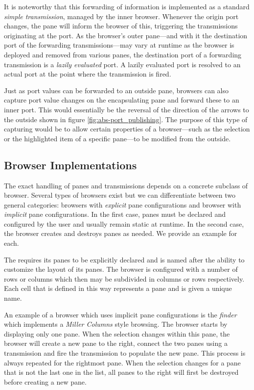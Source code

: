 \documentclass[a4paper,10pt,twoside]{book}
\begin{document}
It is noteworthy that this forwarding of information is implemented as a standard \emph{simple transmission}, managed by the inner browser. Whenever the origin port changes, the pane will inform the browser of this, triggering the transmissions originating at the port. As the browser's outer pane---and with it the destination port of the forwarding transmissions---may vary at runtime as the browser is deployed and removed from various panes, the destination port of a forwarding transmission is a \emph{lazily evaluated} port. A lazily evaluated port is resolved to an actual port at the point where the transmission is fired.

Just as port values can be forwarded to an outside pane, browsers can also capture port value changes on the encapsulating pane and forward these to an inner port. This would essentially be the reversal of the direction of the arrows to the outside shown in figure \ref{fig:abs-port_publishing}. The purpose of this type of capturing would be to allow certain properties of a browser---such as the selection or the highlighted item of a specific pane---to be modified from the outside.



\subsection{Browser Implementations}
\label{sec:impl/browser-implementations}

The exact handling of panes and transmissions depends on a concrete subclass of browser. Several types of browsers exist but we can differentiate between two general categories: browsers with \emph{explicit} pane configurations and browser with \emph{implicit} pane configurations. In the first case, panes must be declared and configured by the user and usually remain static at runtime. In the second case, the browser creates and destroys panes as needed. We provide an example for each.

The  requires its panes to be explicitly declared and is named after the ability to customize the layout of its panes. The browser is configured with a number of rows or columns which then may be subdivided in columns or rows respectively. Each cell that is defined in this way represents a pane and is given a unique name.

An example of a browser which uses implicit pane configurations is the \emph{finder} which implements a \emph{Miller Columns} style browsing. The browser starts by displaying only one pane. When the selection changes within this pane, the browser will create a new pane to the right, connect the two panes using a transmission and fire the transmission to populate the new pane. This process is always repeated for the rightmost pane. When the selection changes for a pane that is not the last one in the list, all panes to the right will first be destroyed before creating a new pane.
\end{document}
